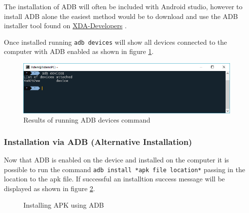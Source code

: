 The installation of ADB will often be included with Android studio,
however to install ADB alone the easiest method would be to download and
use the ADB installer tool found on
\href{https://forum.xda-developers.com/showthread.php?t=2588979}{XDA-Developers}
\cite{AdbInstaller}.

Once installed running \lstinline!adb devices! will show all devices
connected to the computer with ADB enabled as shown in figure
\ref{fig:adbDevices}.

\begin{figure}
  \centering
  \includegraphics[scale=0.5]{Images/adbDevices.png}
  \caption{Results of running ADB devices command}
  \label{fig:adbDevices}
\end{figure}

\subsubsection{Installation via ADB (Alternative
Installation)}\label{installation-via-adb-alternative-installation}

Now that ADB is enabled on the device and installed on the computer it
is possible to run the command
\lstinline!adb install *apk file location*! passing in the location to
the apk file. If successful an installtion success message will be
displayed as shown in figure \ref{fig:adbSuccess}.

\begin{figure}[H]
  \centering
  \qquad
  \caption{Installing APK using ADB}
  \label{fig:adbSuccess}
\end{figure}

